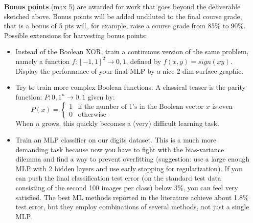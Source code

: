\documentclass[12pt]{article}
\begin{document}
\noindent
\textbf{Bonus points} (max 5) are awarded for work that goes beyond the deliverable sketched above. Bonus points will be added undiluted to the final course grade, that is a bonus of 5 pts will, for example, raise a course grade from 85\% to 90\%.\\
Possible extensions for harvesting bonus points:
\begin{itemize}
	\item Instead of the Boolean XOR, train a continuous version of the same problem, namely a function $f: [-1, 1]^2 \rightarrow {0,1}$, defined by $f(x, y) = sign(xy)$. Display the performance of your final MLP by a nice 2-dim surface graphic.
	\item Try to train more complex Boolean functions. A classical teaser is the parity function: $P: {0,1}^n \rightarrow {0,1}$ given by:
		\begin{equation}
			P(x) = \begin{cases}
				1 & \text{if the number of 1's in the Boolean vector $x$ is even}\\
				0 & \text{otherwise}
			\end{cases}
		\end{equation}
		When $n$ grows, this quickly becomes a (very) difficult learning task.
	\item Train an MLP classifier on our digits dataset. This is a much more demanding task because now you have to fight with the bias-variance dilemma and find a way to prevent overfitting (suggestion: use a large enough MLP with 2 hidden layers and use early stopping for regularization). If you can push the final classification test error (on the standard test data consisting of the second 100 images per class) below 3\%, you can feel very satisfied. The best ML methods reported in the literature achieve about 1.8\% test error, but they employ combinations of several methods, not just a single MLP.
\end{itemize}

\end{document}
